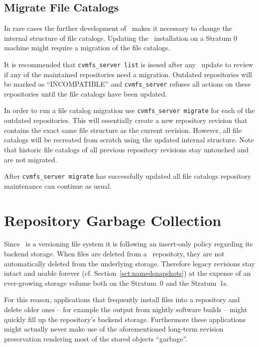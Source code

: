 \subsection{Migrate File Catalogs}
In rare cases the further development of \cvmfs\ makes it necessary to change the internal structure of file catalogs.
Updating the \cvmfs\ installation on a Stratum 0 machine might require a migration of the file catalogs.

It is recommended that \texttt{cvmfs\_server list} is issued after any \cvmfs\ update to review if any of the maintained repositories need a migration.
Outdated repositories will be marked as ``INCOMPATIBLE'' and \texttt{cvmfs\_server} refuses all actions on these repositories until the file catalogs have been updated.

In order to run a file catalog migration use \texttt{cvmfs\_server migrate} for each of the outdated repositories.
This will essentially create a new repository revision that contains the exact same  file structure as the current revision.
However, all file catalogs will be recreated from scratch using the updated internal structure.
Note that historic file catalogs of all previous repository revisions stay untouched and are not migrated.

After \texttt{cvmfs\_server migrate} has successfully updated all file catalogs repository maintenance can continue as usual.



\section{Repository Garbage Collection}
\label{sct:garbagecollection}
Since \cvmfs\ is a versioning file system it is following an insert-only policy regarding its backend storage.
When files are deleted from a \cvmfs\ repository, they are not automatically deleted from the underlying storage.
Therefore legacy revisions stay intact and usable forever (cf. Section~\ref{sct:namedsnapshots}) at the expense of an ever-growing storage volume both on the Stratum~0 and the Stratum~1s.

For this reason, applications that frequently install files into a repository and delete older ones -- for example the output from nightly software builds -- might quickly fill up the repository's backend storage.
Furthermore these applications might actually never make use of the aforementioned long-term revision preservation rendering most of the stored objects ``garbage''.

